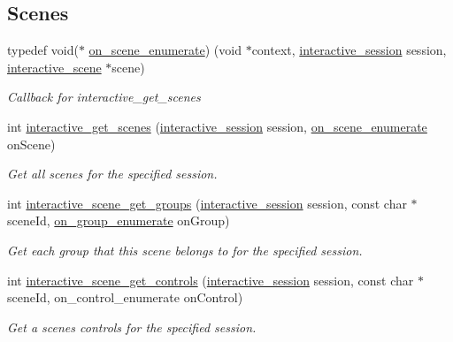 \subsection*{Scenes}
\begin{DoxyCompactItemize}
\item 
typedef void($\ast$ \mbox{\hyperlink{group___interactivity_ga4f096e039d6692c0be600cf0312540a0}{on\+\_\+scene\+\_\+enumerate}}) (void $\ast$context, \mbox{\hyperlink{group___interactivity_ga6d8819d38b8dc8994a2299cf22a65a31}{interactive\+\_\+session}} session, \mbox{\hyperlink{structinteractive__scene}{interactive\+\_\+scene}} $\ast$scene)
\begin{DoxyCompactList}\small\item\em Callback for {\ttfamily interactive\+\_\+get\+\_\+scenes} \end{DoxyCompactList}\item 
int \mbox{\hyperlink{group___interactivity_gad5a3d4eb33ce241ab8df4956cbc78f19}{interactive\+\_\+get\+\_\+scenes}} (\mbox{\hyperlink{group___interactivity_ga6d8819d38b8dc8994a2299cf22a65a31}{interactive\+\_\+session}} session, \mbox{\hyperlink{group___interactivity_ga4f096e039d6692c0be600cf0312540a0}{on\+\_\+scene\+\_\+enumerate}} on\+Scene)
\begin{DoxyCompactList}\small\item\em Get all scenes for the specified session. \end{DoxyCompactList}\item 
int \mbox{\hyperlink{group___interactivity_gab63c2b0d200d3faa4c6d296c31896352}{interactive\+\_\+scene\+\_\+get\+\_\+groups}} (\mbox{\hyperlink{group___interactivity_ga6d8819d38b8dc8994a2299cf22a65a31}{interactive\+\_\+session}} session, const char $\ast$scene\+Id, \mbox{\hyperlink{group___interactivity_ga94f3f5e9c3f20ed45e333767263adbc2}{on\+\_\+group\+\_\+enumerate}} on\+Group)
\begin{DoxyCompactList}\small\item\em Get each group that this scene belongs to for the specified session. \end{DoxyCompactList}\item 
int \mbox{\hyperlink{group___interactivity_ga9ebb3f222872c50a7316b7963cf42011}{interactive\+\_\+scene\+\_\+get\+\_\+controls}} (\mbox{\hyperlink{group___interactivity_ga6d8819d38b8dc8994a2299cf22a65a31}{interactive\+\_\+session}} session, const char $\ast$scene\+Id, on\+\_\+control\+\_\+enumerate on\+Control)
\begin{DoxyCompactList}\small\item\em Get a scene\textquotesingle{}s controls for the specified session. \end{DoxyCompactList}\end{DoxyCompactItemize}
